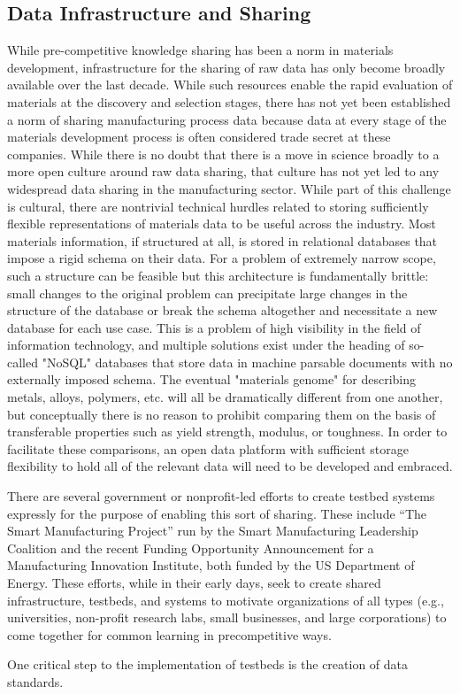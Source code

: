 
\subsection{Data Infrastructure and Sharing}
While pre-competitive knowledge sharing has been a norm in materials development, infrastructure for the sharing of raw data has only become broadly available over the last decade\cite{CitrineInformatics,MP}. While such resources enable the rapid evaluation of materials at the discovery and selection stages, there has not yet been established a norm of sharing manufacturing process data because data at every stage of the materials development process is often considered trade secret at these companies\cite{TheMinerals2013}. While there is no doubt that there is a move in science broadly to a more open culture around raw data sharing, that culture has not yet led to any widespread data sharing in the manufacturing sector.
While part of this challenge is cultural, there are nontrivial technical hurdles related to storing sufficiently flexible representations of materials data to be useful across the industry. 
Most materials information, if structured at all, is stored in relational databases that impose a rigid schema on their data. 
For a problem of extremely narrow scope, such a structure can be feasible but this architecture is fundamentally brittle: small changes to the original problem can precipitate large changes in the structure of the database or break the schema altogether and necessitate a new database for each use case.
This is a problem of high visibility in the field of information technology, and multiple solutions exist under the heading of so-called "NoSQL" databases that store data in machine parsable documents with no externally imposed schema\cite{Han2011,Kaur2013}.
The eventual "materials genome" for describing metals, alloys, polymers, etc. will all be dramatically different from one another, but conceptually there is no reason to prohibit comparing them on the basis of transferable properties such as yield strength, modulus, or toughness. 
In order to facilitate these comparisons, an open data platform with sufficient storage flexibility to hold all of the relevant data will need to be developed and embraced.

There are several government or nonprofit-led efforts to create testbed systems expressly for the purpose of enabling this sort of sharing. These include ``The Smart Manufacturing Project'' run by the Smart Manufacturing Leadership Coalition and the recent Funding Opportunity Announcement for a Manufacturing Innovation Institute, both funded by the US Department of Energy\cite{SmartManufacturingLeadershipCoalition2013,EERE-MII}. These efforts, while in their early days, seek to create shared infrastructure, testbeds, and systems to motivate organizations of all types (e.g., universities, non-profit research labs, small businesses, and large corporations) to come together for common learning in precompetitive ways. 

One critical step to the implementation of testbeds is the creation of data standards. 


